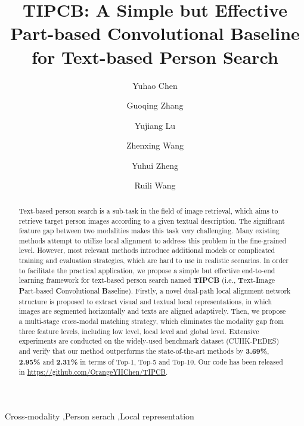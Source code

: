 \documentclass[review]{elsarticle}
\begin{document}
\begin{frontmatter}

\title{TIPCB: A Simple but Effective Part-based Convolutional Baseline for Text-based Person Search}


\author[nuist]{Yuhao Chen}

\author[nuist,massey]{Guoqing Zhang}

\author[nuist]{Yujiang Lu}

\author[math]{Zhenxing Wang}

\author[nuist]{Yuhui Zheng}

\author[massey]{Ruili Wang}

\address[nuist]{School of Computer and Software, Nanjing University of Information Science and Technology, Nanjing, 210044, China}
\address[math]{School of Mathematics and Statistics, Nanjing University of Information Science and Technology, Nanjing, 210044, China}
\address[massey]{Institute of Natural and Mathematical Sciences, Massey University, Auckland, 4442, New Zealand}







\begin{abstract}
Text-based person search is a sub-task in the field of image retrieval, which aims to retrieve target person images according to a given textual description. The significant feature gap between two modalities makes this task very challenging. Many existing methods attempt to utilize local alignment to address this problem in the fine-grained level. However, most relevant methods introduce additional models or complicated training and evaluation strategies, which are hard to use in realistic scenarios. In order to facilitate the practical application, we propose a simple but effective end-to-end learning framework for text-based person search named \textbf{TIPCB} (i.e., \textbf{T}ext-\textbf{I}mage \textbf{P}art-based \textbf{C}onvolutional \textbf{B}aseline). Firstly, a novel dual-path local alignment network structure is proposed to extract visual and textual local representations, in which images are segmented horizontally and texts are aligned adaptively. Then, we propose a multi-stage cross-modal matching strategy, which eliminates the modality gap from three feature levels, including low level, local level and global level. Extensive experiments are conducted on the widely-used benchmark dataset (CUHK-PEDES) and verify that our method outperforms the state-of-the-art methods by \textbf{3.69\%}, \textbf{2.95\%} and \textbf{2.31\%} in terms of Top-1, Top-5 and Top-10. Our code has been released in \textcolor{blue}{\url{https://github.com/OrangeYHChen/TIPCB}}.
\end{abstract}

\begin{keyword}
Cross-modality \sep Person serach \sep Local representation
\end{keyword}

\end{frontmatter}
\end{document}
